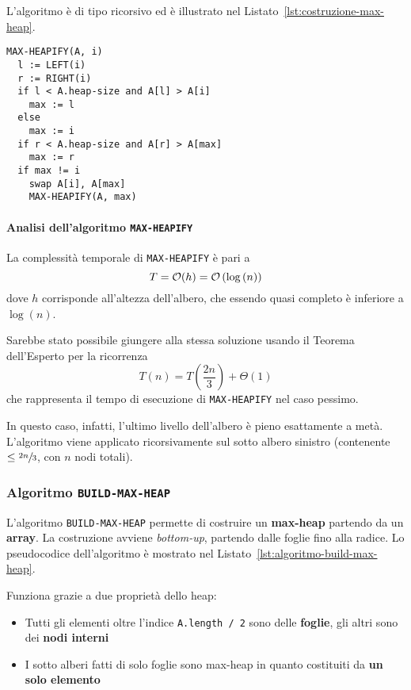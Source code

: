 \documentclass[italian, 10pt]{article}
\begin{document}
L'algoritmo è di tipo ricorsivo ed è illustrato nel Listato~\ref{lst:costruzione-max-heap}.

\begin{lstlisting}[style=pseudocode, caption={Costruzione di un \texttt{MAX-HEAP}}, label={lst:costruzione-max-heap}]
MAX-HEAPIFY(A, i)
  l := LEFT(i)
  r := RIGHT(i)
  if l < A.heap-size and A[l] > A[i]
    max := l
  else
    max := i
  if r < A.heap-size and A[r] > A[max]
    max := r
  if max != i
    swap A[i], A[max]
    MAX-HEAPIFY(A, max)
\end{lstlisting}

\paragraph{Analisi dell'algoritmo \texttt{MAX-HEAPIFY}}

La complessità temporale di \texttt{MAX-HEAPIFY} è pari a
\[ T = \mathcal{O}(h) = \mathcal{O}\left(\log{(n)}\right) \]
dove \(h\) corrisponde all'altezza dell'albero, che essendo quasi completo è inferiore a \(\log{(n)}\).

\bigskip
Sarebbe stato possibile giungere alla stessa soluzione usando il Teorema dell'Esperto per la ricorrenza
\[ T(n) = T\left(\dfrac{2n}{3}\right) + \Theta(1) \]
che rappresenta il tempo di esecuzione di \texttt{MAX-HEAPIFY} nel caso pessimo.

In questo caso, infatti, l'ultimo livello dell'albero è pieno esattamente a metà.
L'algoritmo viene applicato ricorsivamente sul sotto albero sinistro (contenente \(\leq \sfrac{2n}{3}\), con \(n\) nodi totali).

\subsubsection{Algoritmo \texttt{BUILD-MAX-HEAP}}
\label{sec:algoritmo-build-max-heap}

L'algoritmo \texttt{BUILD-MAX-HEAP} permette di costruire un \textbf{max-heap} partendo da un \textbf{array}.
La costruzione avviene \textit{bottom-up}, partendo dalle foglie fino alla radice.
Lo pseudocodice dell'algoritmo è mostrato nel Listato~\ref{lst:algoritmo-build-max-heap}.

Funziona grazie a due proprietà dello heap:

\begin{itemize}
  \item Tutti gli elementi oltre l'indice \texttt{A.length / 2} sono delle \textbf{foglie}, gli altri sono dei \textbf{nodi interni}
  \item I sotto alberi fatti di solo foglie sono max-heap in quanto costituiti da \textbf{un solo elemento}
\end{itemize}
\end{document}
